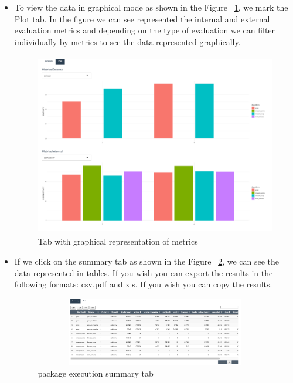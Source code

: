 \begin{enumerate}
\begin{itemize}
    \item To view the data in graphical mode as shown in the Figure ~\ref{fig:tab_graph}, we mark the Plot tab. In the figure we can see represented the internal and external evaluation metrics and depending on the type of evaluation we can filter individually by metrics to see the data represented graphically.

  \begin{figure}[htbp]
    \centering
     \includegraphics[width=14cm, height=8cm]{img/tab_graph}
      \caption{Tab with graphical representation of metrics}
      \label{fig:tab_graph}
  \end{figure}

    \item If we click on the summary tab as shown in the Figure ~\ref{fig:tab_summary}, we can see the data represented in tables. If you wish you can export the results in the following formats: csv,pdf and xls. If you wish you can copy the results.

  \begin{figure}[]
    \centering
     \includegraphics[width=14cm, height=3cm]{img/tab_summary}
      \caption{ package execution summary tab}
      \label{fig:tab_summary}
  \end{figure}

  \end{itemize}

\end{enumerate}
\newpage

